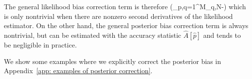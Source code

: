 \documentclass[%
 reprint,
 amsmath,amssymb,
 aps,nofootinbib,nobibnotes,onecolumn,prd
]{revtex4-2}
\newcommand{\rednote}[1]{{\color{Red} #1}}
\begin{document}
The general likelihood bias correction term is therefore
\beq
\exp\left(\sum_{p,q=1}^{M_q,N}-\right)
\label{eq: general likelihood bias correction}
\eeq
which is only nontrivial when there are nonzero second derivatives of the likelihood estimator. On the other hand, the general posterior bias correction term is always nontrivial, but can be estimated with the accuracy statistic $\hat{A}[\hat{p}]$ and tends to be negligible in practice.

We show some examples where we explicitly correct the posterior bias in Appendix~\ref{app: examples of posterior correction}.

\end{document}
